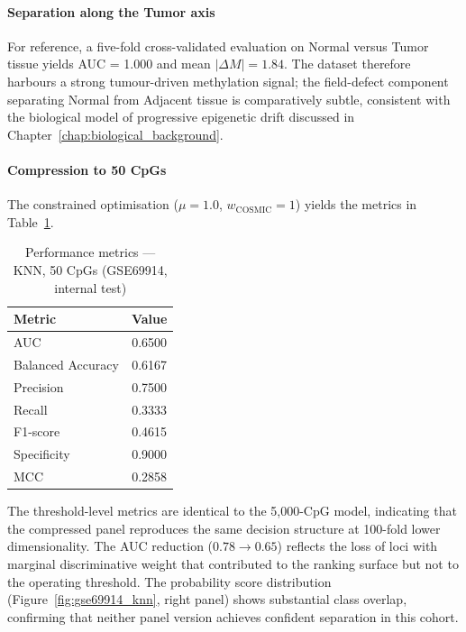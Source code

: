 \paragraph{Separation along the Tumor axis}

For reference, a five-fold cross-validated evaluation on
Normal versus Tumor tissue yields AUC = 1.000 and mean
$|\Delta M| = 1.84$. The dataset therefore harbours a
strong tumour-driven methylation signal; the field-defect
component separating Normal from Adjacent tissue is
comparatively subtle, consistent with the biological
model of progressive epigenetic drift discussed in
Chapter~\ref{chap:biological_background}.

\paragraph{Compression to 50 CpGs}

The constrained optimisation ($\mu = 1.0$,
$w_{\mathrm{COSMIC}} = 1$) yields the metrics in
Table~\ref{tab:gse69914_50}.

\begin{table}[H]
\centering
\caption{Performance metrics — KNN, 50 CpGs
         (GSE69914, internal test)}
\label{tab:gse69914_50}
\begin{tabular}{lc}
\toprule
Metric & Value \\
\midrule
AUC               & 0.6500 \\
Balanced Accuracy & 0.6167 \\
Precision         & 0.7500 \\
Recall            & 0.3333 \\
F1-score          & 0.4615 \\
Specificity       & 0.9000 \\
MCC               & 0.2858 \\
\bottomrule
\end{tabular}
\end{table}

The threshold-level metrics are identical to the 5,000-CpG
model, indicating that the compressed panel reproduces the
same decision structure at 100-fold lower dimensionality.
The AUC reduction ($0.78 \to 0.65$) reflects the loss of
loci with marginal discriminative weight that contributed
to the ranking surface but not to the operating threshold.
The probability score distribution (Figure~\ref{fig:gse69914_knn},
right panel) shows substantial class overlap, confirming
that neither panel version achieves confident separation
in this cohort.

